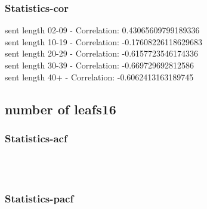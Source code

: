 \documentclass{article}%
\begin{document}
%
\newpage%
\subsubsection{Statistics{-}cor}%
\label{ssubsec:Statistics{-}cor}%
\noindent%
sent length 02-09 - Correlation: 0.43065609799189336\\%
sent length 10-19 - Correlation: -0.17608226118629683\\%
sent length 20-29 - Correlation: -0.6157723546174336\\%
sent length 30-39 - Correlation: -0.669729692812586\\%
sent length 40+ - Correlation: -0.6062413163189745\\

%
\newpage

%
\subsection{number of leafs16}%
\label{subsec:numberofleafs16}%
\subsubsection{Statistics{-}acf}%
\label{ssubsec:Statistics{-}acf}%


\begin{figure}[ht]%
\centering%
\setlength{\abovecaptionskip}{-35pt}%
%
%
\\%
%
%
\\%
%
\end{figure}

%
\newpage%
\subsubsection{Statistics{-}pacf}%
\label{ssubsec:Statistics{-}pacf}%
\end{document}
